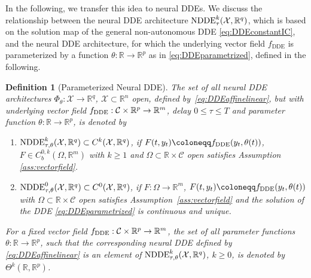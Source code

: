 \documentclass[10pt]{article}
\numberwithin{equation}{section}
\newtheorem{definition}[theorem]{Definition}
\begin{document}
	In the following, we transfer this idea to neural DDEs. We discuss the relationship between the neural DDE architecture $\textup{NDDE}^k_{\tau}(\mathcal{X},\mathbb{R}^q)$, which is based on the solution map of the general non-autonomous DDE \eqref{eq:DDEconstantIC}, and the neural DDE architecture, for which the underlying vector field $f_\text{DDE}$ is parameterized by a function $\theta: \mathbb{R}\rightarrow \mathbb{R}^{p}$ as in \eqref{eq:DDEparametrized}, defined in the following.
	
	\begin{definition}[Parameterized Neural DDE] \label{def:NDDEparameterized}
		The set of all neural DDE architectures $\Phi_\theta: \mathcal{X} \rightarrow \mathbb{R}^q$, $\mathcal{X}\subset \mathbb{R}^n$ open, defined by~\eqref{eq:DDEaffinelinear}, but with underlying vector field $f_\textup{DDE}:\mathcal{C}\times \mathbb{R}^{p}\rightarrow \mathbb{R}^m$, delay $0\leq \tau\leq T$ and parameter function $\theta:\mathbb{R}\rightarrow \mathbb{R}^{p}$, is denoted by
		\begin{enumerate}[label=(\alph*), font=\normalfont]
			\item \label{def:NDDEparameterized_a} $\textup{NDDE}_{\tau,\theta}^k(\mathcal{X},\mathbb{R}^q)\subset C^k(\mathcal{X},\mathbb{R}^q)$, if $F(t,y_t) \coloneqq f_\textup{DDE}(y_t,\theta(t))$,  $F\in C_b^{0,k}(\Omega,\mathbb{R}^m)$ with $k \geq 1$ and $\Omega\subset \mathbb{R}\times \mathcal{C}$ open satisfies Assumption \ref{ass:vectorfield}.
			\item \label{def:NDDEparameterized_b} $\textup{NDDE}_{\tau,\theta}^0(\mathcal{X},\mathbb{R}^q)\subset C^0(\mathcal{X},\mathbb{R}^q)$, if $F: \Omega \rightarrow \mathbb{R}^m$, $F(t,y_t) \coloneqq f_\textup{DDE}(y_t,\theta(t))$ with $\Omega\subset \mathbb{R}\times \mathcal{C}$ open satisfies Assumption~\ref{ass:vectorfield} and the solution of the  DDE \eqref{eq:DDEparametrized} is continuous and unique. 
		\end{enumerate}
		For a fixed vector field $f_\textup{DDE}:\mathcal{C}\times \mathbb{R}^{p}\rightarrow \mathbb{R}^m$, the set of all parameter functions $\theta:\mathbb{R}\rightarrow \mathbb{R}^{p}$, such that the corresponding neural DDE defined by \eqref{eq:DDEaffinelinear} is an element of $\textup{NDDE}_{\tau,\theta}^k(\mathcal{X},\mathbb{R}^q)$, $k \geq 0$, is denoted by $\Theta^k(\mathbb{R},\mathbb{R}^{p})$.
	\end{definition}
	
\end{document}
